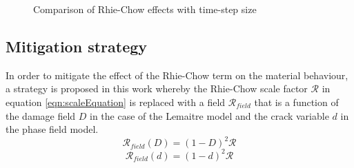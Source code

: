 \documentclass[sn-mathphys,Numbered,draft]{sn-jnl}%
\begin{document}
\begin{figure}[t!]
	\centering
		\qquad
				\qquad
	
	\caption{Comparison of Rhie-Chow effects with time-step size}
	\label{label_for_entire_figure}
\end{figure}

\subsection{Mitigation strategy}

In order to mitigate the effect of the Rhie-Chow term on the material behaviour, a strategy is proposed in this work whereby the Rhie-Chow scale factor $\mathcal{R}$ in equation \ref{eqn:scaleEquation} is replaced with a field $\mathcal{R}_{field}$ that is a function of the damage field $D$ in the case of the Lemaitre model and the crack variable $d$ in the phase field model. 
\begin{equation}
   \mathcal{R}_{field}(D)=(1-D)^2\mathcal{R}
\end{equation}
\begin{equation}
   \mathcal{R}_{field}(d)=(1-d)^2\mathcal{R} 
\end{equation}
\end{document}
